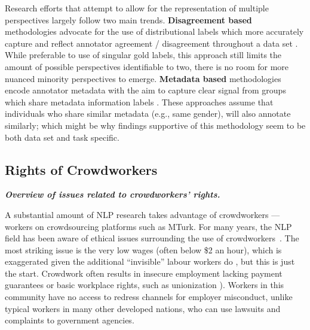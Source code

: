 Research efforts that attempt to allow for the representation of multiple perspectives largely follow two main trends. \textbf{Disagreement based} methodologies advocate for the use of distributional labels which more accurately capture and reflect annotator agreement / disagreement throughout a data set \citep{mokhberian-etal-2024-capturing,leonardelli-etal-2023-semeval,uma2022scaling,uma2021learning}. While preferable to use of singular gold labels, this approach still limits the amount of possible perspectives identifiable to two, there is no room for more nuanced minority perspectives to emerge. \textbf{Metadata based} methodologies encode annotator metadata with the aim to capture clear signal from groups which share metadata information labels \citep{rottger-etal-2022-two, davani-etal-2023-hate, fleisig-etal-2023-majority, 10.1145/3543507.3583290}. These approaches assume that individuals who share similar metadata (e.g., same gender), will also annotate similarly; which might be why findings supportive of this methodology seem to be both data set \citep{lee-etal-2023-large} and task \citep{welch-etal-2020-compositional} specific.


\subsection{Rights of Crowdworkers}\label{subsec:rights}\noindent\textbf{\textit{Overview of issues related to crowdworkers' rights.}}
\newline 

\noindent A substantial amount of NLP research takes
advantage of crowdworkers — workers on crowdsourcing platforms such as MTurk. 
For many years, the NLP field has been aware of ethical issues surrounding the use of 
crowdworkers~\cite{fort_last_2011, fort_crowdsourcing_2014, bederson_web_2011}. 
The most striking issue is the very low wages (often below \$2 an hour), which is exaggerated given the additional ``invisible'' labour workers do \citep{hara_data-driven_2018, toxtli_quantifying_2021}, but this is just the start. 
Crowdwork often results in insecure employment lacking payment guarantees or basic workplace rights, such as unionization \citep[cf][]{perrigo_150_2023}). Workers in this community have no access to redress channels for employer misconduct, unlike typical workers in many other developed nations, who can use lawsuits and complaints to government agencies.


